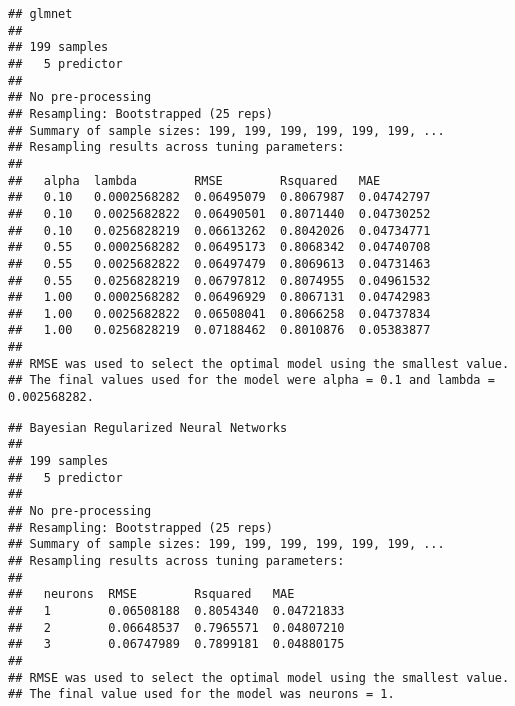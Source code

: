 \documentclass[11pt,]{article}
\newenvironment{Shaded}{\begin{snugshade}}{\end{snugshade}}
\newcommand{\CommentTok}[1]{\textcolor[rgb]{0.56,0.35,0.01}{\textit{#1}}}
\newcommand{\KeywordTok}[1]{\textcolor[rgb]{0.13,0.29,0.53}{\textbf{#1}}}
\newcommand{\NormalTok}[1]{#1}
\newcommand{\OperatorTok}[1]{\textcolor[rgb]{0.81,0.36,0.00}{\textbf{#1}}}
\begin{document}
\begin{verbatim}
## glmnet 
## 
## 199 samples
##   5 predictor
## 
## No pre-processing
## Resampling: Bootstrapped (25 reps) 
## Summary of sample sizes: 199, 199, 199, 199, 199, 199, ... 
## Resampling results across tuning parameters:
## 
##   alpha  lambda        RMSE        Rsquared   MAE       
##   0.10   0.0002568282  0.06495079  0.8067987  0.04742797
##   0.10   0.0025682822  0.06490501  0.8071440  0.04730252
##   0.10   0.0256828219  0.06613262  0.8042026  0.04734771
##   0.55   0.0002568282  0.06495173  0.8068342  0.04740708
##   0.55   0.0025682822  0.06497479  0.8069613  0.04731463
##   0.55   0.0256828219  0.06797812  0.8074955  0.04961532
##   1.00   0.0002568282  0.06496929  0.8067131  0.04742983
##   1.00   0.0025682822  0.06508041  0.8066258  0.04737834
##   1.00   0.0256828219  0.07188462  0.8010876  0.05383877
## 
## RMSE was used to select the optimal model using the smallest value.
## The final values used for the model were alpha = 0.1 and lambda = 0.002568282.
\end{verbatim}

\begin{Shaded}
\end{Shaded}

\begin{verbatim}
## Bayesian Regularized Neural Networks 
## 
## 199 samples
##   5 predictor
## 
## No pre-processing
## Resampling: Bootstrapped (25 reps) 
## Summary of sample sizes: 199, 199, 199, 199, 199, 199, ... 
## Resampling results across tuning parameters:
## 
##   neurons  RMSE        Rsquared   MAE       
##   1        0.06508188  0.8054340  0.04721833
##   2        0.06648537  0.7965571  0.04807210
##   3        0.06747989  0.7899181  0.04880175
## 
## RMSE was used to select the optimal model using the smallest value.
## The final value used for the model was neurons = 1.
\end{verbatim}

\begin{Shaded}
\end{Shaded}
\end{document}
